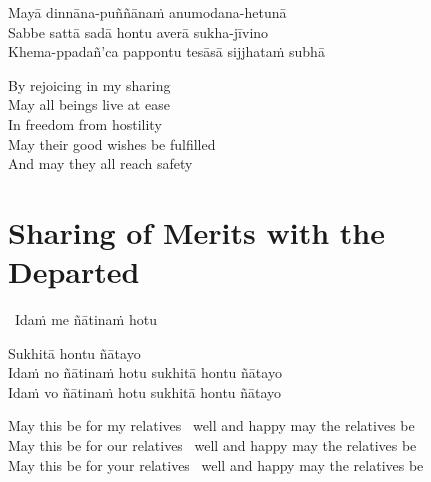 Mayā dinnāna-puññānaṁ anumodana-hetunā\\
Sabbe sattā sadā hontu averā sukha-jīvino\\
Khema-ppadañ'ca pappontu tesāsā sijjhataṁ subhā

\begin{english-verses}
  By rejoicing in my sharing\\
  May all beings live at ease\\
  In freedom from hostility\\
  May their good wishes be fulfilled\\
  And may they all reach safety
\end{english-verses}

\suttaRef{[Thai]}




\section{Sharing of Merits with the Departed}
\label{sharing-merits-departed}

\begin{leader-only}
  \anglebracketleft\ \hspace{-0.5mm}Idaṁ me ñātinaṁ hotu \hspace{-0.5mm}\anglebracketright\
\end{leader-only}

\vspace{-0.99em}

\begin{pali-hang}
  Sukhitā hontu ñātayo\\
  Idaṁ no ñātinaṁ hotu sukhitā hontu ñātayo\\
  Idaṁ vo ñātinaṁ hotu sukhitā hontu ñātayo
\end{pali-hang}

\begin{english-verses}
  May this be for my relatives \breathmark\ well and happy may the relatives be\\
  May this be for our relatives \breathmark\ well and happy may the relatives be\\
  May this be for your relatives \breathmark\ well and happy may the relatives be
\end{english-verses}

\suttaRef{[Pv 422]}




